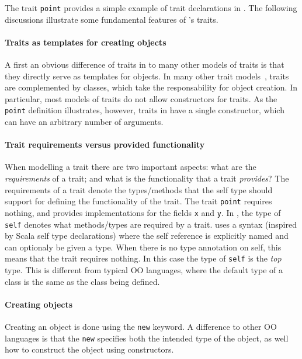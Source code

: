 The trait \lstinline{point} provides a simple example of trait
declarations in \name. The following discussions illustrate 
some fundamental features of \name's traits.

\paragraph{Traits as templates for creating objects} A first an
obvious difference of traits in \name to many other models of traits
is that they directly serve as templates for objects. In many other
trait models~\cite{}, traits are complemented by classes, which take 
the responsability for object creation. In particular, most models
of traits do not allow constructors for traits. As the
\lstinline{point} definition illustrates, however, traits in \name 
have a single constructor, which can have an arbitrary number of arguments.

\paragraph{Trait requirements versus provided functionality}
When modelling a trait there are two important 
aspects: what are the \emph{requirements} of a trait; and what is 
the functionality that a trait \emph{provides}? The requirements of a
trait denote the types/methods that the self type should support for
defining the functionality of the trait.
The trait \lstinline{point}
requires nothing, and provides implementations for the fields 
\lstinline{x} and \lstinline{y}.  In \name, the type
of \lstinline$self$ denotes what methods/types are required 
by a trait. \name uses a syntax (inspired by Scala 
self type declarations) where the self reference is explicitly named 
and can optionaly be given a type. When there is no type annotation 
on self, this means that the trait requires nothing. In this case 
the type of \lstinline{self} is the \emph{top} type. 
This is different from typical OO languages, where the default type 
of a class is the same as the class being defined.


\paragraph{Creating objects}
Creating an object is done using the \lstinline{new} keyword. A
difference to other OO languages is that the \lstinline{new} specifies
both the intended type of the object, as well how to construct the
object using constructors.

